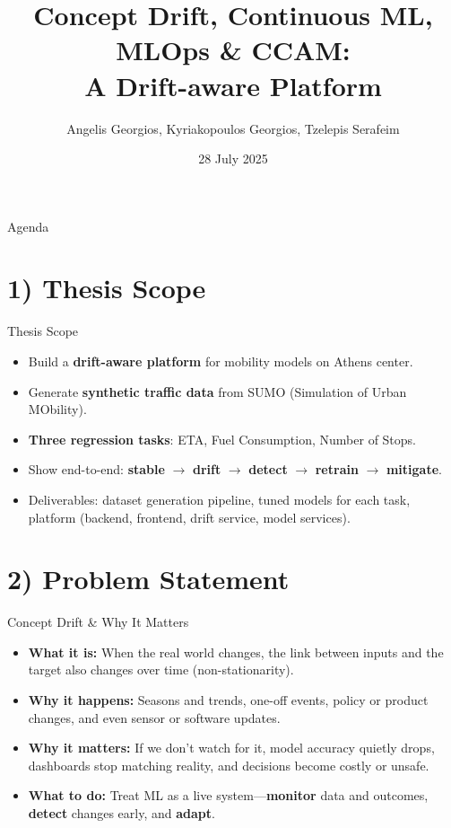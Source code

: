 \documentclass[aspectratio=169]{beamer}
\title{Concept Drift, Continuous ML, MLOps \& CCAM:\\
A Drift-aware Platform}
\author{Angelis Georgios, Kyriakopoulos Georgios, Tzelepis Serafeim}
\institute{School of Electrical and Computer Engineering, National Technical University of Athens}
\date{28 July 2025}
\begin{document}
\begin{frame}
  \titlepage
\end{frame}

\begin{frame}{Agenda}
  \tableofcontents
\end{frame}

\section{1) Thesis Scope}
\begin{frame}{Thesis Scope}
  \begin{itemize}
    \item Build a \textbf{drift-aware platform} for mobility models on Athens center.
    \item Generate \textbf{synthetic traffic data} from SUMO (Simulation of Urban MObility).
    \item \textbf{Three regression tasks}: ETA, Fuel Consumption, Number of Stops.
    \item Show end-to-end: \textbf{stable} $\rightarrow$ \textbf{drift} $\rightarrow$ \textbf{detect} $\rightarrow$ \textbf{retrain} $\rightarrow$ \textbf{mitigate}.
    \item Deliverables: dataset generation pipeline, tuned models for each task, platform (backend, frontend, drift service, model services).
  \end{itemize}
\end{frame}

\section{2) Problem Statement}
\begin{frame}{Concept Drift \& Why It Matters}
  \begin{itemize}
    \item \textbf{What it is:} When the real world changes, the link between inputs and the target also changes over time (non-stationarity).
    \item \textbf{Why it happens:} Seasons and trends, one-off events, policy or product changes, and even sensor or software updates.
    \item \textbf{Why it matters:} If we don't watch for it, model accuracy quietly drops, dashboards stop matching reality, and decisions become costly or unsafe.
    \item \textbf{What to do:} Treat ML as a live system—\textbf{monitor} data and outcomes, \textbf{detect} changes early, and \textbf{adapt}.
  \end{itemize}
\end{frame}
\end{document}
